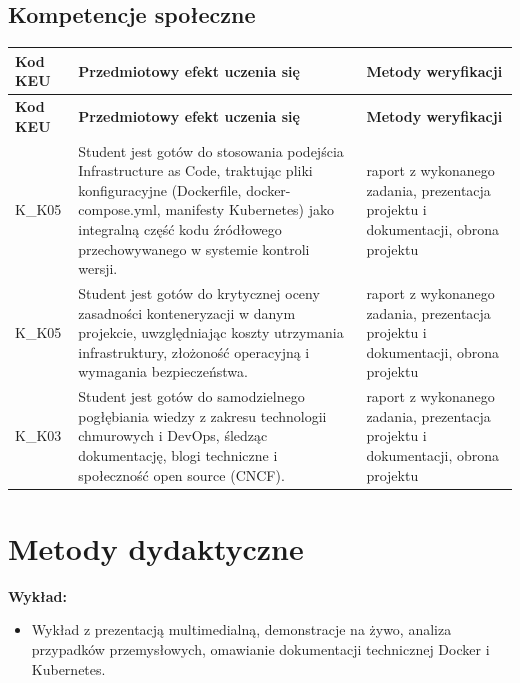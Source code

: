 \documentclass[12pt, a4paper]{article}
\newcommand{\thdrule}{\noalign{\global\setlength{\extrarowheight}{0pt}}}
\newcommand{\thdend}{\noalign{\global\setlength{\extrarowheight}{3pt}}}
\begin{document}
\subsection*{Kompetencje społeczne}
{\scriptsize
\begin{longtable}{m{1.6cm}m{9.0cm}m{4.2cm}}
\thdrule\toprule
\rowcolor{pjatkRed} {\color{white}\footnotesize\textbf{\vphantom{Ag}Kod KEU}} & {\color{white}\footnotesize\textbf{\vphantom{Ag}Przedmiotowy efekt uczenia się}} & {\color{white}\footnotesize\textbf{\vphantom{Ag}Metody weryfikacji}} \\
\midrule\thdend
\endfirsthead
\thdrule\toprule
\rowcolor{pjatkRed} {\color{white}\footnotesize\textbf{\vphantom{Ag}Kod KEU}} & {\color{white}\footnotesize\textbf{\vphantom{Ag}Przedmiotowy efekt uczenia się}} & {\color{white}\footnotesize\textbf{\vphantom{Ag}Metody weryfikacji}} \\
\midrule\thdend
\endhead
  \rowcolor{tableRowLight} K\_K05 & Student jest gotów do stosowania podejścia Infrastructure as Code, traktując pliki konfiguracyjne (Dockerfile, docker-compose.yml, manifesty Kubernetes) jako integralną część kodu źródłowego przechowywanego w systemie kontroli wersji. & raport z wykonanego zadania, prezentacja projektu i dokumentacji, obrona projektu \\
  \rowcolor{tableRowAlt} K\_K05 & Student jest gotów do krytycznej oceny zasadności konteneryzacji w danym projekcie, uwzględniając koszty utrzymania infrastruktury, złożoność operacyjną i wymagania bezpieczeństwa. & raport z wykonanego zadania, prezentacja projektu i dokumentacji, obrona projektu \\
  \rowcolor{tableRowLight} K\_K03 & Student jest gotów do samodzielnego pogłębiania wiedzy z zakresu technologii chmurowych i DevOps, śledząc dokumentację, blogi techniczne i społeczność open source (CNCF). & raport z wykonanego zadania, prezentacja projektu i dokumentacji, obrona projektu \\
\bottomrule
\end{longtable}}

\section{Metody dydaktyczne}

\textbf{Wykład:}
\begin{itemize}
  \item Wykład z prezentacją multimedialną, demonstracje na żywo, analiza przypadków przemysłowych, omawianie dokumentacji technicznej Docker i Kubernetes.
\end{itemize}
\vspace{4pt}
\end{document}
